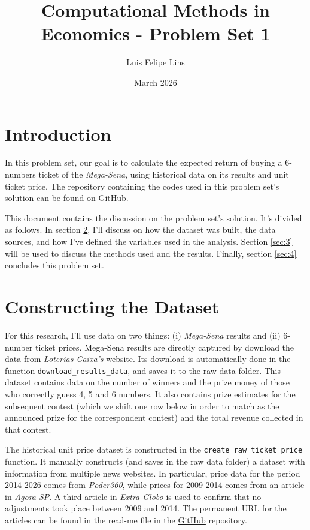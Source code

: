 \documentclass{article}
\title{Computational Methods in Economics - Problem Set 1}
\author{Luis Felipe Lins}
\date{March 2026}
\begin{document}
\maketitle

\section{Introduction}

In this problem set, our goal is to calculate the expected return of buying a 6-numbers ticket of the \textit{Mega-Sena}, using historical data on its results and unit ticket price. The repository containing the codes used in this problem set's solution can be found on \href{https://github.com/luisfelipelins/Computational-Methods-in-Economics}{GitHub}. 

This document contains the discussion on the problem set's solution. It's divided as follows. In section \ref{sec:2}, I'll discuss on how the dataset was built, the data sources, and how I've defined the variables used in the analysis. Section \ref{sec:3} will be used to discuss the methods used and the results. Finally, section \ref{sec:4} concludes this problem set.

\section{Constructing the Dataset}
\label{sec:2}

For this research, I'll use data on two things: (i) \textit{Mega-Sena} results and (ii) 6-number ticket prices. Mega-Sena results are directly captured by download the data from \textit{Loterias Caixa's} website. Its download is automatically done in the function \lstinline|download_results_data|, and saves it to the raw data folder. This dataset contains data on the number of winners and the prize money of those who correctly guess 4, 5 and 6 numbers. It also contains prize estimates for the subsequent contest (which we shift one row below in order to match as the announced prize for the correspondent contest) and the total revenue collected in that contest.

The historical unit price dataset is constructed in the \lstinline|create_raw_ticket_price| function. It manually constructs (and saves in the raw data folder) a dataset with information from multiple news websites. In particular, price data for the period 2014-2026 comes from \textit{Poder360}, while prices for 2009-2014 comes from an article in \textit{Agora SP}. A third article in \textit{Extra Globo} is used to confirm that no adjustments took place between 2009 and 2014. The permanent URL for the articles can be found in the read-me file in the \href{https://github.com/luisfelipelins/Computational-Methods-in-Economics}{GitHub} repository.
\end{document}
